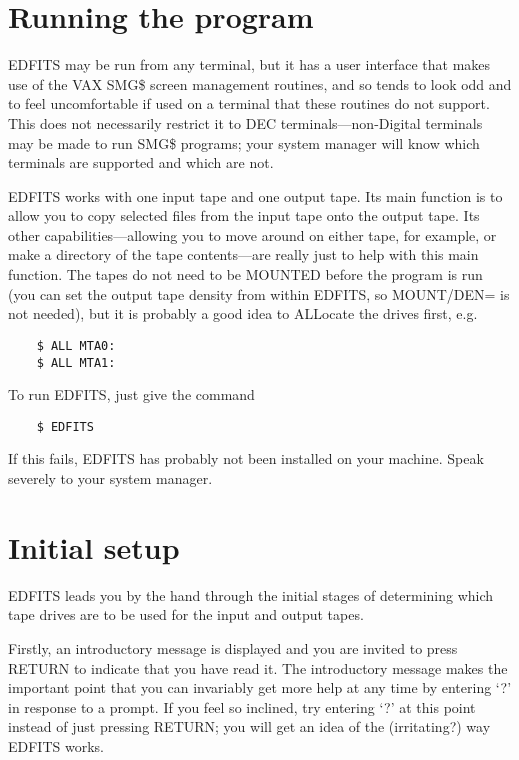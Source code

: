 \section{Running the program}

EDFITS may be run from any terminal, but it has a user interface that makes
use of the VAX SMG\$ screen management routines, and so tends to look odd
and to feel uncomfortable if used on a terminal that these routines do not
support.   This does not necessarily restrict it to DEC terminals---non-Digital
terminals may be made to run SMG\$ programs; your system manager will know
which terminals are supported and which are not.

EDFITS works with one input tape and one output tape.  Its main function is
to allow you to copy selected files from the input tape onto the output tape.
Its other capabilities---allowing you to move around on either tape, for
example, or make a directory of the tape contents---are really just to help
with this main function. The tapes do not need to be MOUNTED before the
program is run (you can set the output tape density from within EDFITS, so
MOUNT/DEN= is not needed), but it is probably a good idea to ALLocate the
drives first,
e.g.
\begin{verbatim}
    $ ALL MTA0:
    $ ALL MTA1:
\end{verbatim}

To run EDFITS, just give the command
\begin{verbatim}
    $ EDFITS
\end{verbatim}

If this fails, EDFITS has probably not been installed on your machine.  Speak
severely to your system manager.

\section{Initial setup}

EDFITS leads you by the hand through the initial stages of determining
which tape drives are to be used for the input and output tapes.

Firstly, an introductory message is displayed and you are invited to press
RETURN to indicate that you have read it.  The introductory message makes the
important point that you can invariably get more help at any time by entering
`?' in response to a prompt.  If you feel so inclined, try entering `?'
at this point instead of just pressing RETURN; you will get an idea of the
(irritating?) way EDFITS works.

